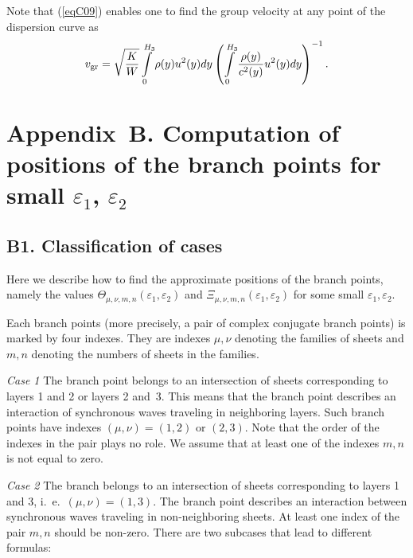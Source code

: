 \documentclass[12pt]{article}
\newcommand{\eps}{\varepsilon}
\begin{document}
Note that (\ref{eqC09}) enables one to find the group velocity at any point of the 
dispersion curve as  
\begin{equation}
v_{\rm gr} =
\sqrt{\frac{K}{W}}  \int \limits_0^{H_3} \rho(y) u^2(y) dy
\left( 
\int \limits_0^{H_3} \frac{\rho(y)}{c^2(y)} u^2(y) dy
\right)^{-1}.
\label{eqC11}
\end{equation}


\section*{Appendix~B. Computation of positions of the branch points for small $\eps_1$, 
$\eps_2$}

\subsection*{B1. Classification of cases}

Here we describe how to find the approximate positions of the branch points, namely 
the values $\Theta_{\mu,\nu,m,n}(\eps_1 , \eps_2)$ and 
$\Xi_{\mu,\nu,m,n}(\eps_1 , \eps_2)$ for some small 
$\eps_1 , \eps_2$. 

Each branch points (more precisely, a pair of complex conjugate branch points) is marked 
by four indexes. They are indexes $\mu, \nu$ denoting the families of sheets and $m,n$
denoting the numbers of sheets in the families. 


{\em Case 1}
The branch point belongs to an intersection of sheets corresponding to layers 
1 and 2 or layers 2 and~3. This means that the branch point describes an interaction of synchronous waves traveling in neighboring layers. Such branch points have indexes 
$(\mu , \nu) = (1 , 2)$ or $(2 , 3)$. Note that the order of the indexes in the pair plays no role. We assume that at least one of the indexes $m,n$ is not equal to zero.  


{\em Case 2}
The branch belongs to an intersection of sheets corresponding to layers 1 and 3, 
i.~e.\ $(\mu,\nu) = (1,3)$. The branch point describes an interaction between synchronous waves traveling in non-neighboring sheets. At least one index of the pair $m,n$
should be non-zero. There are two subcases that lead to different formulas:
\end{document}

